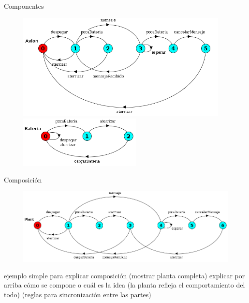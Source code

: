 \begin{frame}{Componentes}
    \begin{figure}
     \includegraphics[width=0.95\textwidth]{figures/avion.png}
     \includegraphics[width=0.55\textwidth]{figures/bateria.png}
    \end{figure}
\end{frame}
\begin{frame}{Composición}
    \begin{figure}
     \includegraphics[width=\textwidth]{figures/planta.png}
    \end{figure}

    ejemplo simple para explicar composición (mostrar planta completa)
    explicar por arriba cómo se compone o cuál es la idea (la planta refleja el comportamiento del todo) (reglas para sincronización entre las partes)
\end{frame}
